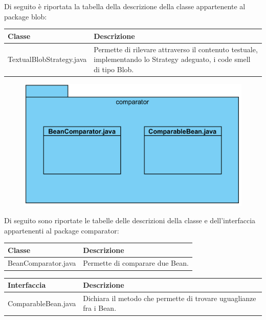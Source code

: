 \documentclass[11pt]{article}
\begin{document}
\begin{description}
\begin{figure}[!h]
				\end{figure}
			Di seguito è riportata la tabella della descrizione della classe appartenente al package blob:	
				\item \begin{tabular}{|p{}|p{}|}
					\hline
					\textbf{Classe} & \textbf{Descrizione}\\
					\hline
					TextualBlobStrategy.java & Permette di rilevare attraverso il contenuto testuale, implementando lo Strategy adeguato, i code smell di tipo Blob. \\
					\hline
				\end{tabular}					
				\item[ 2.1.1.2.2 Package comparator] 
				\item \begin{figure}[!h]
					\centering
					\includegraphics{diagrams/ComparatorPackageDiagram}
				\end{figure}
				Di seguito sono riportate le tabelle delle descrizioni della classe e dell'interfaccia appartenenti al package comparator:
				\item \begin{tabular}{|p{}|p{}|}
					\hline
					\textbf{Classe} & \textbf{Descrizione}\\
					\hline
					BeanComparator.java & Permette di comparare due Bean. \\
					\hline
				\end{tabular}
				\item \begin{tabular}{|p{}|p{}|}
					\hline
					\textbf{Interfaccia} & \textbf{Descrizione}\\
					\hline
					ComparableBean.java & Dichiara il metodo che permette di trovare uguaglianze fra i Bean. \\
					\hline
				\end{tabular}
				

\end{description}
\end{document}
